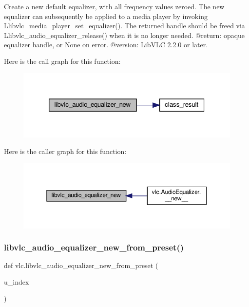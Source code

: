 \begin{DoxyVerb}Create a new default equalizer, with all frequency values zeroed.
The new equalizer can subsequently be applied to a media player by invoking
L{libvlc_media_player_set_equalizer}().
The returned handle should be freed via L{libvlc_audio_equalizer_release}() when
it is no longer needed.
@return: opaque equalizer handle, or None on error.
@version: LibVLC 2.2.0 or later.
\end{DoxyVerb}
 Here is the call graph for this function\+:
\nopagebreak
\begin{figure}[H]
\begin{center}
\leavevmode
\includegraphics[width=320pt]{namespacevlc_a12209b15e0da9a0481e4f7571f617dda_cgraph}
\end{center}
\end{figure}
Here is the caller graph for this function\+:
\nopagebreak
\begin{figure}[H]
\begin{center}
\leavevmode
\includegraphics[width=350pt]{namespacevlc_a12209b15e0da9a0481e4f7571f617dda_icgraph}
\end{center}
\end{figure}
\mbox{\label{namespacevlc_aeaf5e53ef0f358b71fc1796b0bc0a114}} 
\subsubsection{\texorpdfstring{libvlc\+\_\+audio\+\_\+equalizer\+\_\+new\+\_\+from\+\_\+preset()}{libvlc\_audio\_equalizer\_new\_from\_preset()}}
{\footnotesize\ttfamily def vlc.\+libvlc\+\_\+audio\+\_\+equalizer\+\_\+new\+\_\+from\+\_\+preset (\begin{DoxyParamCaption}\item[{}]{u\+\_\+index }\end{DoxyParamCaption})}

